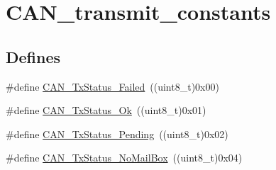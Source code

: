 \hypertarget{group__CAN__transmit__constants}{
\section{CAN\_\-transmit\_\-constants}
\label{group__CAN__transmit__constants}
}
\subsection*{Defines}
\begin{DoxyCompactItemize}
\item 
\#define \hyperlink{group__CAN__transmit__constants_ga8d193002e76c04ec8caff6b110cd5983}{CAN\_\-TxStatus\_\-Failed}~((uint8\_\-t)0x00)
\item 
\#define \hyperlink{group__CAN__transmit__constants_ga0b401c61922b1449de9b486dcf475c97}{CAN\_\-TxStatus\_\-Ok}~((uint8\_\-t)0x01)
\item 
\#define \hyperlink{group__CAN__transmit__constants_ga9678a3a51379422868083608c7394409}{CAN\_\-TxStatus\_\-Pending}~((uint8\_\-t)0x02)
\item 
\#define \hyperlink{group__CAN__transmit__constants_ga2620e99debd51011d3569121f2e44690}{CAN\_\-TxStatus\_\-NoMailBox}~((uint8\_\-t)0x04)
\end{DoxyCompactItemize}


